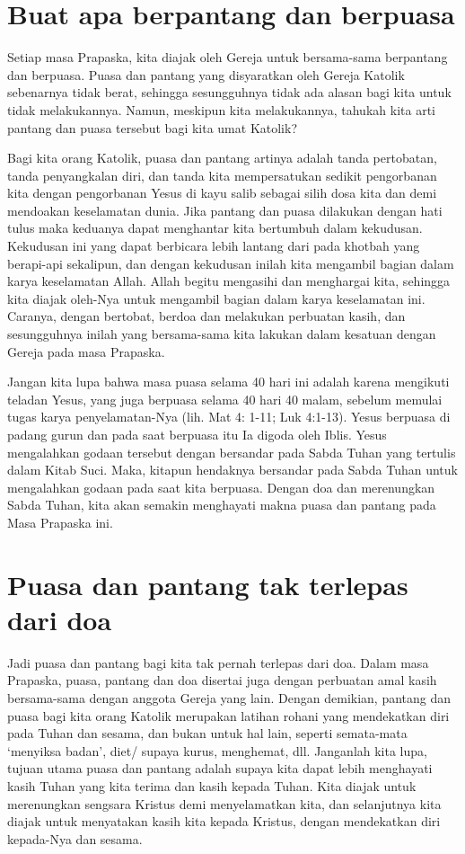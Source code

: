 \section*{Buat apa berpantang dan berpuasa}
Setiap masa Prapaska, kita diajak oleh Gereja untuk bersama-sama berpantang dan berpuasa. Puasa dan pantang yang disyaratkan oleh Gereja Katolik sebenarnya tidak berat, sehingga sesungguhnya tidak ada alasan bagi kita untuk tidak melakukannya. Namun, meskipun kita melakukannya, tahukah kita arti pantang dan puasa tersebut bagi kita umat Katolik?

Bagi kita orang Katolik, puasa dan pantang artinya adalah tanda pertobatan, tanda penyangkalan diri, dan tanda kita mempersatukan sedikit pengorbanan kita dengan pengorbanan Yesus di kayu salib sebagai silih dosa kita dan demi mendoakan keselamatan dunia. Jika pantang dan puasa dilakukan dengan hati tulus maka keduanya dapat menghantar kita bertumbuh dalam kekudusan. Kekudusan ini yang dapat berbicara lebih lantang dari pada khotbah yang berapi-api sekalipun, dan dengan kekudusan inilah kita mengambil bagian dalam karya keselamatan Allah. Allah begitu mengasihi dan menghargai kita, sehingga kita diajak oleh-Nya untuk mengambil bagian dalam karya keselamatan ini. Caranya, dengan bertobat, berdoa dan melakukan perbuatan kasih, dan sesungguhnya inilah yang bersama-sama kita lakukan dalam kesatuan dengan Gereja pada masa Prapaska.

Jangan kita lupa bahwa  masa puasa selama 40 hari ini adalah karena mengikuti teladan Yesus, yang juga berpuasa selama 40 hari 40 malam, sebelum memulai tugas karya penyelamatan-Nya (lih. Mat 4: 1-11; Luk 4:1-13). Yesus berpuasa di padang gurun dan pada saat berpuasa itu Ia digoda oleh Iblis. Yesus mengalahkan godaan tersebut dengan bersandar pada Sabda Tuhan yang tertulis dalam Kitab Suci. Maka, kitapun hendaknya bersandar pada Sabda Tuhan untuk mengalahkan godaan pada saat kita berpuasa. Dengan doa dan merenungkan Sabda Tuhan, kita akan semakin menghayati makna puasa dan pantang pada Masa Prapaska ini.

\section*{Puasa dan pantang tak terlepas dari doa}
Jadi puasa dan pantang bagi kita tak pernah terlepas dari doa. Dalam masa Prapaska, puasa, pantang dan doa disertai juga dengan perbuatan amal kasih bersama-sama dengan anggota Gereja yang lain. Dengan demikian, pantang dan puasa bagi kita orang Katolik merupakan latihan rohani yang mendekatkan diri pada Tuhan dan sesama, dan bukan untuk hal lain, seperti semata-mata `menyiksa badan', diet/ supaya kurus, menghemat, dll. Janganlah kita lupa, tujuan utama puasa dan pantang adalah supaya kita dapat lebih menghayati kasih Tuhan yang kita terima dan kasih kepada Tuhan. Kita diajak untuk merenungkan sengsara Kristus demi menyelamatkan kita, dan selanjutnya kita diajak untuk menyatakan kasih kita kepada Kristus, dengan mendekatkan diri kepada-Nya dan sesama.

